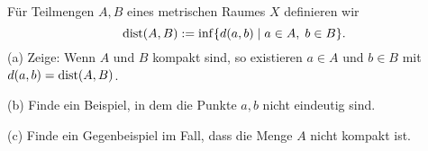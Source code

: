 \begin{prob}
F\"ur Teilmengen $A,B$ eines metrischen Raumes $X$
definieren wir
$$
   {\rm dist}(A,B) := \inf\{d(a,b)\mid a\in A,\;b\in B\}.
$$
(a) Zeige: Wenn $A$ und $B$ kompakt sind, so existieren $a\in A$ und $b\in
B$ mit $d(a,b)={\rm dist}(A,B)$. 

(b) Finde ein Beispiel, in dem die Punkte $a,b$ nicht eindeutig sind. 

(c) Finde ein Gegenbeispiel im Fall, dass die Menge $A$ nicht kompakt
ist. 
\end{prob}
